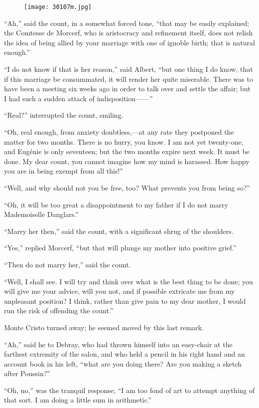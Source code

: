 \begin{figure}[ht]
\texttt{[image: 30107m.jpg]}
\end{figure}

“Ah,” said the count, in a somewhat forced tone, “that may be easily
explained; the Comtesse de Morcerf, who is aristocracy and refinement
itself, does not relish the idea of being allied by your marriage with
one of ignoble birth; that is natural enough.”

“I do not know if that is her reason,” said Albert, “but one thing I do
know, that if this marriage be consummated, it will render her quite
miserable. There was to have been a meeting six weeks ago in order to
talk over and settle the affair; but I had such a sudden attack of
indisposition——”

“Real?” interrupted the count, smiling.

“Oh, real enough, from anxiety doubtless,—at any rate they postponed
the matter for two months. There is no hurry, you know. I am not yet
twenty-one, and Eugénie is only seventeen; but the two months expire
next week. It must be done. My dear count, you cannot imagine how my
mind is harassed. How happy you are in being exempt from all this!”

“Well, and why should not you be free, too? What prevents you from
being so?”

“Oh, it will be too great a disappointment to my father if I do not
marry Mademoiselle Danglars.”

“Marry her then,” said the count, with a significant shrug of the
shoulders.

“Yes,” replied Morcerf, “but that will plunge my mother into positive
grief.”

“Then do not marry her,” said the count.

“Well, I shall see. I will try and think over what is the best thing to
be done; you will give me your advice, will you not, and if possible
extricate me from my unpleasant position? I think, rather than give
pain to my dear mother, I would run the risk of offending the count.”

Monte Cristo turned away; he seemed moved by this last remark.

“Ah,” said he to Debray, who had thrown himself into an easy-chair at
the farthest extremity of the salon, and who held a pencil in his right
hand and an account book in his left, “what are you doing there? Are
you making a sketch after Poussin?”

“Oh, no,” was the tranquil response; “I am too fond of art to attempt
anything of that sort. I am doing a little sum in arithmetic.”

